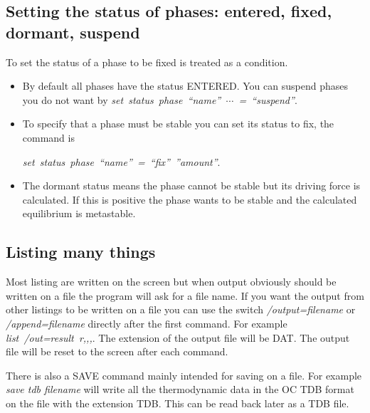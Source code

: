 \documentclass[12pt]{article}
\begin{document}
\subsection{Setting the status of phases: entered, fixed, dormant, suspend}

To set the status of a phase to be fixed is treated as a condition.

\begin{itemize}
\item By default all phases have the status ENTERED.  You can suspend
  phases you do not want by {\em
    set~status~phase~``name''~$\cdots$~=~``suspend''}.

\item To specify that a phase must be stable you can set its status to
  fix, the command is

  {\em set~status~phase~``name''~=~``fix''~''amount''}.

\item The dormant status means the phase cannot be stable but its
  driving force is calculated.  If this is positive the phase wants to
  be stable and the calculated equilibrium is metastable.
\end{itemize}

\subsection{Listing many things}

Most listing are written on the screen but when output obviously
should be written on a file the program will ask for a file name.  If
you want the output from other listings to be written on a file you
can use the switch {\em /output=filename} or {\em /append=filename}
directly after the first command.  For example {\em list~/out=result~r,,,}.
The extension of the output file will be DAT.  The output file will be
reset to the screen after each command.

There is also a SAVE command mainly intended for saving on a file.
For example {\em save tdb filename} will write all the thermodynamic
data in the OC TDB format on the file with the extension TDB.  This
can be read back later as a TDB file.
\end{document}
